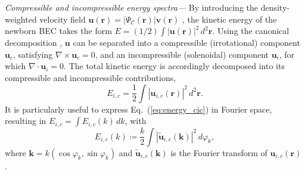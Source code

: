 \documentclass[aps,prl,twocolumn,showpacs,notitlepage,floatfix,superscriptaddress]{revtex4-1}
\begin{document}
{\it Compressible and incompressible energy spectra---}
By introducing the density-weighted velocity field $\boldsymbol{u}(\boldsymbol{r})=|\Psi_{\mathcal{C}}(\boldsymbol{r})|\boldsymbol{v}(\boldsymbol{r})$ \cite{Nore1997PRL,Nore97,Ogawa2002,Kobayashi2005}, the kinetic energy of the newborn BEC takes the form 
$
E=
\left( 
1
/ 2 \right) 
\int |\boldsymbol{u}(\boldsymbol{r})|^2 \, d^2 \boldsymbol{r} . 
$
Using the canonical decomposition \cite{Nore1997PRL,Nore97,Ogawa2002,Kobayashi2005}, $\boldsymbol{u}$ can be separated into a compressible (irrotational) component $\boldsymbol{u}_c$, satisfying $\nabla \times \boldsymbol{u}_c = 0$, and an incompressible (solenoidal) component $\boldsymbol{u}_{i}$, for which $\nabla \cdot \boldsymbol{u}_{i} = 0$. The total kinetic energy is accordingly decomposed into its compressible and incompressible contributions,
\begin{equation}
E_{i,c} = \frac{
1
}{2} \int |\boldsymbol{u}_{i,c}(\boldsymbol{r})|^2 \, d^2 \boldsymbol{r}.
\label{eq:energy_cic}
\end{equation}
It is particularly useful to express Eq.~(\ref{eq:energy_cic}) in Fourier space, resulting in
$E_{i,c} = \int E_{i,c}(k) \, d k$, with
\begin{equation}
E_{i,c}(k) \coloneqq
\frac{k}{2}
\int 
|\boldsymbol{\tilde{u}}_{i, c} ( \boldsymbol{k} )|^{2} \, d \varphi_k,
\label{eq:energy_cic_fft}
\end{equation}
where $\boldsymbol{k} = k ( \cos \varphi_k, \sin \varphi_k )$ and $\boldsymbol{\tilde{u}}_{i,c}(\boldsymbol{k})$ is the Fourier transform of $\boldsymbol{u}_{i,c}(\boldsymbol{r})$ \cite{Bradley12}.
\end{document}
